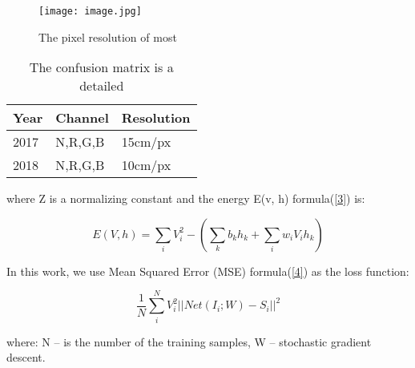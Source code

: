 \documentclass[12pt]{article}
\begin{document}
\begin{figure}[H]
    \centering
    \texttt{[image: image.jpg]}
    \caption{The pixel resolution of most }
    \label{1}
\end{figure}

\begin{table}[h!]
    \begin{center}
        \caption{The confusion matrix is a detailed}
        \label{2}
          \begin{tabular}{|p{3cm}|p{4cm}|p{4cm}|}
          \hline
           Year&Channel&Resolution\\
          \hline
          2017&N,R,G,B&15cm/px\\
          \hline
          2018&N,R,G,B&10cm/px\\
          \hline
          \end{tabular}
   \end{center}
\end{table}

\raggedright where Z is a normalizing constant and the energy E(v, h) 
formula(\ref{3}) is: \newline

\begin{equation}
\label{3}
E(V,h)=\sum_i V^2_i -\left( \sum_k b_k h_k + \sum_i w_i V_i h_k \right)
\end{equation}

\newpage

\raggedright In this work, we use Mean Squared Error (MSE) formula(\ref{4}) as the loss function:

\begin{equation}
\label{4}
\frac{1}{N}\sum^N_i V^2_i|| Net(I_i;W)-S_i||^2
\end{equation}

\raggedright where: N  –  is the number of the training samples,
\newline
 W  –  stochastic gradient descent.
 
\end{document}
